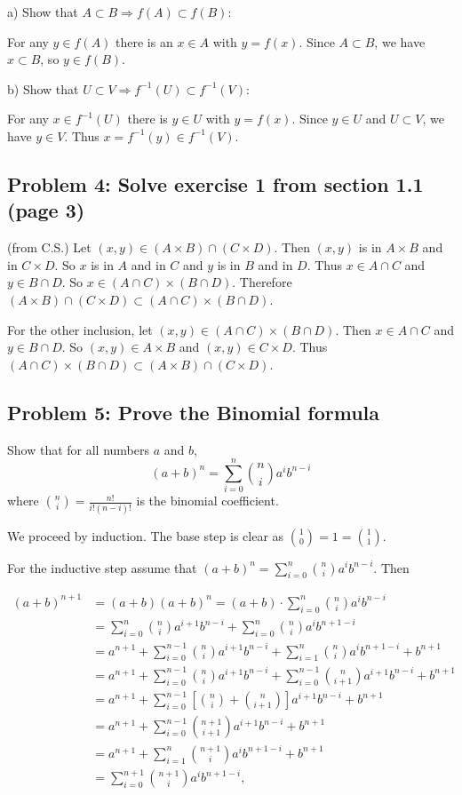 \documentclass[11pt]{article}
\begin{document}
a) Show that $A\subset B \Rightarrow f(A)\subset f(B)$:

For any $y\in f(A)$ there is an $x\in A$ with $y=f(x)$. Since $A\subset B$, we have $x\subset B$, so $y\in f(B)$.

b) Show that $U\subset V \Rightarrow f^{-1}(U)\subset f^{-1}(V)$:

For any $x\in f^{-1}(U)$ there is $y\in U$ with $y=f(x)$. Since $y\in U$ and $U\subset V$, we have $y\in V$. Thus $x=f^{-1}(y)\in f^{-1}(V)$.

\subsection*{Problem 4: Solve exercise 1 from section 1.1 (page 3) }

(from C.S.) Let $(x,y)\in (A\times B)\cap (C\times D)$. Then $(x,y)$ is in $A\times B$ and in
$C\times D$. So $x $ is in $A$ and in $C$ and $y$ is in $B $ and in $D$. Thus
$x\in A\cap C$ and
$y\in B\cap D$. So
 $x\in (A\cap C)\times (B\cap D)$.
Therefore $(A\times B)\cap (C\times D)\subset (A\cap C)\times (B\cap D)$.

For the other inclusion, let $(x,y) \in (A\cap C)\times (B\cap D)$.
Then $x\in A\cap C$ and $y\in B\cap D$. So $(x,y)\in A\times B$ and
$(x,y)\in C\times D$. Thus $ (A\cap C)\times (B\cap D)\subset (A\times B)\cap (C\times D)$.

\subsection*{Problem 5:  Prove the Binomial formula  }

Show that for all numbers $a$ and $b$, \[(a+b)^n=\sum_{i=0}^n \binom{n}{i} a^i b^{n-i}\] where $\binom{n}{i}=\frac{n!}{i!(n-i)!}$ is the binomial coefficient.


We proceed by induction. The base step is clear as $\binom{1}{0}=1=\binom{1}{1}$.

For the inductive step assume that $(a+b)^n=\sum_{i=0}^n \binom{n}{i} a^i b^{n-i}$.
Then

\renewcommand{\arraystretch}{1.5}
$$
\begin{array}{rl}
(a+b)^{n+1} &= (a+b)(a+b)^n=(a+b) \cdot \sum_{i=0}^n \binom{n}{i} a^i b^{n-i}\\
&=\sum_{i=0}^n \binom{n}{i} a^{i+1} b^{n-i}+\sum_{i=0}^n \binom{n}{i} a^i b^{n+1-i}\\
&=a^{n+1}+\sum_{i=0}^{n-1} \binom{n}{i} a^{i+1} b^{n-i}+\sum_{i=1}^n \binom{n}{i} a^i b^{n+1-i}+b^{n+1}\\
&=a^{n+1}+\sum_{i=0}^{n-1} \binom{n}{i} a^{i+1} b^{n-i}+\sum_{i=0}^{n-1} \binom{n}{i+1} a^{i+1} b^{n-i}+b^{n+1}\\
&=a^{n+1}+\sum_{i=0}^{n-1} \left[\binom{n}{i}+\binom{n}{i+1}\right]  a^{i+1} b^{n-i}+b^{n+1}\\
&=a^{n+1}+\sum_{i=0}^{n-1} \binom{n+1}{i+1}  a^{i+1} b^{n-i}+b^{n+1}\\
&=a^{n+1}+\sum_{i=1}^{n} \binom{n+1}{i}  a^{i} b^{n+1-i}+b^{n+1}\\
&=\sum_{i=0}^{n+1} \binom{n+1}{i} a^{i} b^{n+1-i},
\end{array}
$$
\end{document}
